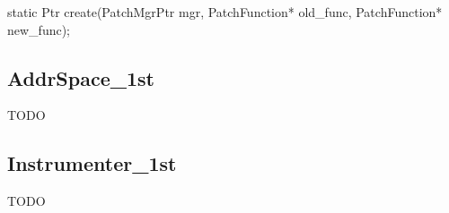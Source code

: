 \begin{apient}
static Ptr create(PatchMgrPtr mgr, PatchFunction* old_func, PatchFunction* new_func);
\end{apient}


\subsection{AddrSpace\_1st}
\label{sec-3.3.6}


TODO

\subsection{Instrumenter\_1st}
\label{sec-3.3.7}


TODO
